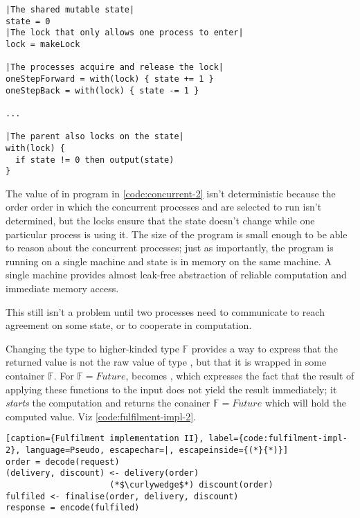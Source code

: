\begin{lstlisting}[caption={Locked shared mutable state}, label={code:concurrent-2}, language=Pseudo, escapechar=|]
|The shared mutable state|
state = 0
|The lock that only allows one process to enter|
lock = makeLock

|The processes acquire and release the lock|
oneStepForward = with(lock) { state += 1 }
oneStepBack = with(lock) { state -= 1 }

...

|The parent also locks on the state|
with(lock) {
  if state != 0 then output(state)
}
\end{lstlisting}

The value of  in program in \autoref{code:concurrent-2} isn't deterministic because the order order in which the concurrent processes  and  are selected to run isn't determined, but the locks ensure that the state doesn't change while one particular process is using it. The size of the program is small enough to be able to reason about the concurrent processes; just as importantly, the program is running on a single machine and state is in memory on the same machine. A single machine provides almost leak-free abstraction of reliable computation and immediate memory access.

This still isn't a problem until two processes need to communicate to reach agreement on some state, or to cooperate in computation. 



Changing the type  to higher-kinded type $\mathds{F}$ provides a way to express that the returned value is not the raw value of type , but that it is wrapped in some container $\mathds{F}$. For $\mathds{F} = Future$,  becomes , which expresses the fact that the result of applying these functions to the input does not yield the result immediately; it \emph{starts} the computation and returns the conainer $\mathds{F} = Future$ which will hold the computed value. Viz \autoref{code:fulfilment-impl-2}.

\begin{lstlisting}[caption={Fulfilment implementation II}, label={code:fulfilment-impl-2}, language=Pseudo, escapechar=|, escapeinside={(*}{*)}]
order = decode(request)
(delivery, discount) <- delivery(order) 
                     (*$\curlywedge$*) discount(order)
fulfiled <- finalise(order, delivery, discount)
response = encode(fulfiled)
\end{lstlisting}


